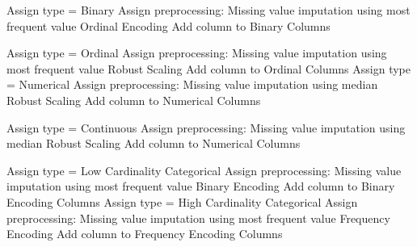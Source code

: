 \begin{algorithm}[H]
\caption{Column Type Detection and Preprocessing Assignment}
\begin{algorithmic}[1]


        \STATE Assign type = Binary
        \STATE Assign preprocessing:
        \STATE \hspace{0.5cm} Missing value imputation using most frequent value
        \STATE \hspace{0.5cm} Ordinal Encoding
        \STATE Add column to Binary Columns


            \STATE Assign type = Ordinal
            \STATE Assign preprocessing:
            \STATE \hspace{0.5cm} Missing value imputation using most frequent value
            \STATE \hspace{0.5cm} Robust Scaling
            \STATE Add column to Ordinal Columns
        \ELSE
            \STATE Assign type = Numerical
            \STATE Assign preprocessing:
            \STATE \hspace{0.5cm} Missing value imputation using median
            \STATE \hspace{0.5cm} Robust Scaling
            \STATE Add column to Numerical Columns
        \ENDIF

        \STATE Assign type = Continuous
        \STATE Assign preprocessing:
        \STATE \hspace{0.5cm} Missing value imputation using median
        \STATE \hspace{0.5cm} Robust Scaling
        \STATE Add column to Numerical Columns


            \STATE Assign type = Low Cardinality Categorical
            \STATE Assign preprocessing:
            \STATE \hspace{0.5cm} Missing value imputation using most frequent value
            \STATE \hspace{0.5cm} Binary Encoding
            \STATE Add column to Binary Encoding Columns
        \ELSE
            \STATE Assign type = High Cardinality Categorical
            \STATE Assign preprocessing:
            \STATE \hspace{0.5cm} Missing value imputation using most frequent value
            \STATE \hspace{0.5cm} Frequency Encoding
            \STATE Add column to Frequency Encoding Columns
        \ENDIF


\end{algorithmic}
\end{algorithm}
